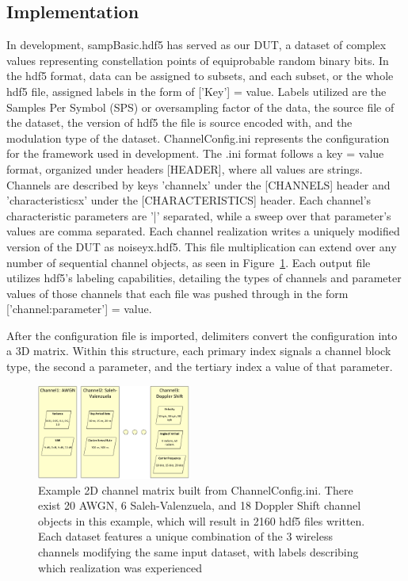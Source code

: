 \subsection{Implementation}
\label{sec3}
In development, sampBasic.hdf5 has served as our DUT, a dataset of complex values representing constellation points of equiprobable random binary bits. In the hdf5 format, data can be assigned to subsets, and each subset, or the whole hdf5 file, assigned labels in the form of ['Key'] = value. Labels utilized are the Samples Per Symbol (SPS) or oversampling factor of the data, the source file of the dataset, the version of hdf5 the file is source encoded with, and the modulation type of the dataset. ChannelConfig.ini represents the configuration for the framework used in development. The .ini format follows a key = value format, organized under headers [HEADER], where all values are strings. Channels are described by keys 'channelx' under the [CHANNELS] header and 'characteristicsx' under the [CHARACTERISTICS] header. Each channel's characteristic parameters are '|' separated, while a sweep over that parameter's values are comma separated. Each channel realization writes a uniquely modified version of the DUT as noiseyx.hdf5. This file multiplication can extend over any number of sequential channel objects, as seen in Figure~\ref{fig:channeltoolstructure}. Each output file utilizes hdf5's labeling capabilities, detailing the types of channels and parameter values of those channels that each file was pushed through in the form ['channel:parameter'] = value.

After the configuration file is imported, delimiters convert the configuration into a 3D matrix. Within this structure, each primary index signals a channel block type, the second a parameter, and the tertiary index a value of that parameter.

\begin{figure}[ht!]
	\centering	\includegraphics[width=0.45\textwidth,keepaspectratio]{figs/vtc_list_structure.eps}
    \caption{Example 2D channel matrix built from ChannelConfig.ini. There exist 20 AWGN, 6 Saleh-Valenzuela, and 18 Doppler Shift channel objects in this example, which will result in 2160 hdf5 files written. Each dataset features a unique combination of the 3 wireless channels modifying the same input dataset, with labels describing which realization was experienced} 
\label{fig:channeltoolstructure}      
\end{figure}

